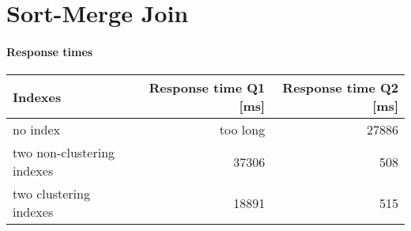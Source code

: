 \documentclass[11pt]{scrartcl}
\begin{document}
\section{Sort-Merge Join}

\paragraph{Response times}

\begin{flushleft}
\begin{tabular}{l|r|r}
  Indexes & Response time Q1 [ms] & Response time Q2 [ms] \\
  \hline
  no index & too long & 27886 \\
  two non-clustering indexes & 37306 & 508 \\
  two clustering indexes & 18891 & 515  \\
\end{tabular}
\end{flushleft}
\end{document}

